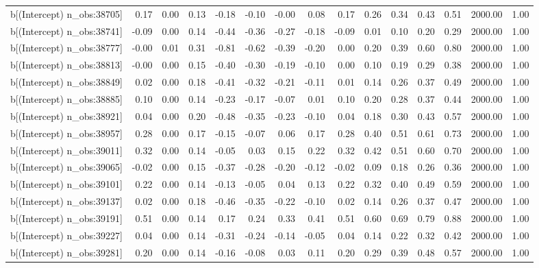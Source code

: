 \begin{table}[ht]
\begin{tabular}{rrrrrrrrrrrrrrr}
  b[(Intercept) n\_obs:38705] & 0.17 & 0.00 & 0.13 & -0.18 & -0.10 & -0.00 & 0.08 & 0.17 & 0.26 & 0.34 & 0.43 & 0.51 & 2000.00 & 1.00 \\ 
  b[(Intercept) n\_obs:38741] & -0.09 & 0.00 & 0.14 & -0.44 & -0.36 & -0.27 & -0.18 & -0.09 & 0.01 & 0.10 & 0.20 & 0.29 & 2000.00 & 1.00 \\ 
  b[(Intercept) n\_obs:38777] & -0.00 & 0.01 & 0.31 & -0.81 & -0.62 & -0.39 & -0.20 & 0.00 & 0.20 & 0.39 & 0.60 & 0.80 & 2000.00 & 1.00 \\ 
  b[(Intercept) n\_obs:38813] & -0.00 & 0.00 & 0.15 & -0.40 & -0.30 & -0.19 & -0.10 & 0.00 & 0.10 & 0.19 & 0.29 & 0.38 & 2000.00 & 1.00 \\ 
  b[(Intercept) n\_obs:38849] & 0.02 & 0.00 & 0.18 & -0.41 & -0.32 & -0.21 & -0.11 & 0.01 & 0.14 & 0.26 & 0.37 & 0.49 & 2000.00 & 1.00 \\ 
  b[(Intercept) n\_obs:38885] & 0.10 & 0.00 & 0.14 & -0.23 & -0.17 & -0.07 & 0.01 & 0.10 & 0.20 & 0.28 & 0.37 & 0.44 & 2000.00 & 1.00 \\ 
  b[(Intercept) n\_obs:38921] & 0.04 & 0.00 & 0.20 & -0.48 & -0.35 & -0.23 & -0.10 & 0.04 & 0.18 & 0.30 & 0.43 & 0.57 & 2000.00 & 1.00 \\ 
  b[(Intercept) n\_obs:38957] & 0.28 & 0.00 & 0.17 & -0.15 & -0.07 & 0.06 & 0.17 & 0.28 & 0.40 & 0.51 & 0.61 & 0.73 & 2000.00 & 1.00 \\ 
  b[(Intercept) n\_obs:39011] & 0.32 & 0.00 & 0.14 & -0.05 & 0.03 & 0.15 & 0.22 & 0.32 & 0.42 & 0.51 & 0.60 & 0.70 & 2000.00 & 1.00 \\ 
  b[(Intercept) n\_obs:39065] & -0.02 & 0.00 & 0.15 & -0.37 & -0.28 & -0.20 & -0.12 & -0.02 & 0.09 & 0.18 & 0.26 & 0.36 & 2000.00 & 1.00 \\ 
  b[(Intercept) n\_obs:39101] & 0.22 & 0.00 & 0.14 & -0.13 & -0.05 & 0.04 & 0.13 & 0.22 & 0.32 & 0.40 & 0.49 & 0.59 & 2000.00 & 1.00 \\ 
  b[(Intercept) n\_obs:39137] & 0.02 & 0.00 & 0.18 & -0.46 & -0.35 & -0.22 & -0.10 & 0.02 & 0.14 & 0.26 & 0.37 & 0.47 & 2000.00 & 1.00 \\ 
  b[(Intercept) n\_obs:39191] & 0.51 & 0.00 & 0.14 & 0.17 & 0.24 & 0.33 & 0.41 & 0.51 & 0.60 & 0.69 & 0.79 & 0.88 & 2000.00 & 1.00 \\ 
  b[(Intercept) n\_obs:39227] & 0.04 & 0.00 & 0.14 & -0.31 & -0.24 & -0.14 & -0.05 & 0.04 & 0.14 & 0.22 & 0.32 & 0.42 & 2000.00 & 1.00 \\ 
  b[(Intercept) n\_obs:39281] & 0.20 & 0.00 & 0.14 & -0.16 & -0.08 & 0.03 & 0.11 & 0.20 & 0.29 & 0.39 & 0.48 & 0.57 & 2000.00 & 1.00 \\ 

\end{tabular}
\end{table}
